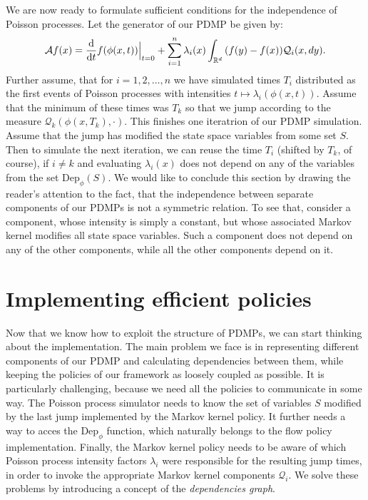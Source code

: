 \documentclass[report.tex]{subfiles}
\begin{document}
We are now ready to formulate sufficient conditions
for the independence of Poisson processes. Let the generator of our PDMP be given
by:
\begin{equation}
  \label{pdmp-generator-n-components}
  \mathcal{A}f(x) =
  \dv{}{t}f(\phi(x, t)) \Bigr|_{t = 0} +
  \sum_{i=1}^{n} \lambda_{i}(x)\int_{{\mathbb{R}^{d}}}^{{}} {}{(f(y) - f(x))\mathcal{Q}_{i}(x, dy)}.
\end{equation}
Further assume, that for $i = 1, 2, \dots, n$
we have simulated times $T_{i}$ distributed as the first events of Poisson processes
with intensities $t \mapsto \lambda_{i}(\phi(x, t))$.
Assume that the minimum of these times was $T_{k}$ so that we jump according
to the measure $\mathcal{Q}_{k}(\phi(x, T_{k}), \cdot)$.
This finishes one iteratrion of our PDMP simulation.
Assume that the jump has modified the state space variables from some set
$S$. Then to simulate the next iteration, we can reuse the time $T_{i}$ (shifted by $T_{k}$, of course),
if $i \neq k$ and evaluating $\lambda_{i}(x)$ does not depend on any of the variables from the
set $\text{Dep}_{\phi}(S)$. We would like to conclude this section by drawing the
reader's attention to the fact, that the independence between separate components
of our PDMPs is not a symmetric relation. To see that, consider a component, whose
intensity is simply a constant, but whose associated Markov kernel modifies all
state space variables. Such a component does not depend on any of the other components,
while all the other components depend on it.


\section{Implementing efficient policies}
\label{efficient-policies-implementation}

Now that we know how to exploit the structure of PDMPs, we can start thinking about
the implementation.
The main problem we face is in representing different components of our PDMP
and calculating dependencies between them, while keeping the policies of our
framework as loosely coupled as possible.
It is particularly challenging, because we need all the policies to communicate in some way.
The Poisson process simulator needs to know the set of variables $S$ modified by
the last jump implemented by the Markov kernel policy.
It further needs a way to acces the $\text{Dep}_{\phi}$ function, which naturally
belongs to the flow policy implementation.
Finally, the Markov kernel policy needs to be aware of which Poisson process
intensity factors $\lambda_{i}$ were responsible for the resulting jump times, in order to invoke
the appropriate Markov kernel components $\mathcal{Q}_{i}$.
We solve these problems by introducing a concept of the \textit{dependencies graph}.
\end{document}
